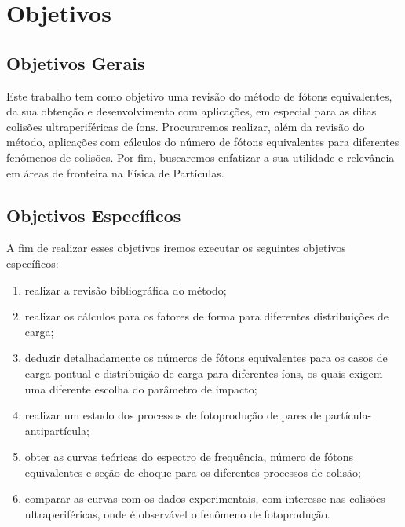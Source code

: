 \chapter{Objetivos}

\section{Objetivos Gerais}
Este trabalho tem como objetivo uma revisão do método de fótons equivalentes,
da sua obtenção e desenvolvimento com aplicações, em especial para as ditas
colisões ultraperiféricas de íons. Procuraremos realizar, além da
revisão do método, aplicações com cálculos do número de fótons equivalentes
para diferentes fenômenos de colisões. Por fim, buscaremos enfatizar a sua
utilidade e relevância em áreas de fronteira na Física de Partículas.


\section{Objetivos Específicos}
A fim de realizar esses objetivos iremos executar os seguintes objetivos
específicos:
\begin{enumerate}
\item realizar a revisão bibliográfica do método;
\item realizar os cálculos para os fatores de forma para diferentes distribuições
	de carga;
\item deduzir detalhadamente os números de fótons equivalentes para os casos de
	carga pontual e distribuição de carga para diferentes íons, os quais exigem
	uma diferente escolha do parâmetro de impacto;
\item realizar um estudo dos processos de fotoprodução de pares de
	partícula-antipartícula; 
\item obter as curvas teóricas do espectro de frequência, número de fótons
equivalentes e seção de choque para os diferentes processos de colisão;
\item comparar as curvas com os dados experimentais, com interesse nas
colisões ultraperiféricas, onde é observável o fenômeno de fotoprodução.
\end{enumerate}

